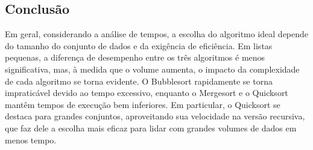 \subsection{Conclusão}
 Em geral, considerando a análise de tempos, a escolha do algoritmo ideal depende do tamanho do conjunto de dados e da exigência de eficiência.
Em listas pequenas, a diferença de desempenho entre os três algoritmos é menos significativa, mas, à medida que o volume aumenta, o impacto da complexidade de cada algoritmo se torna evidente.
O Bubblesort rapidamente se torna impraticável devido ao tempo excessivo, enquanto o Mergesort e o Quicksort mantêm tempos de execução bem inferiores. Em particular, o Quicksort se destaca para grandes conjuntos, 
aproveitando sua velocidade na versão recursiva, que faz dele a escolha mais eficaz para lidar com grandes volumes de dados em menos tempo.